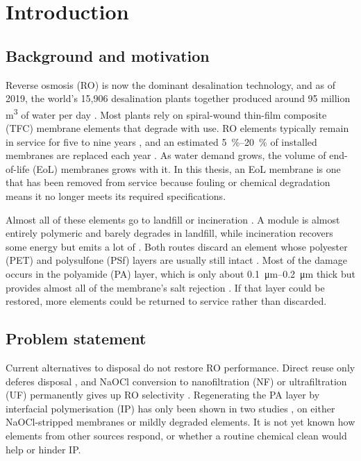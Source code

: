 \chapter{Introduction}
\label{ch:introduction}


\section{Background and motivation}
\label{sec:background}
Reverse osmosis (RO) is now the dominant desalination technology, and as of 2019, the world's 15,906 desalination plants together produced around 95 million \unit{\cubic\metre} of water per day \citep{Jones2019}. Most plants rely on spiral-wound thin-film composite (TFC) membrane elements that degrade with use. RO elements typically remain in service for five to nine years \citep{Ding_2026,Lawler2015}, and an estimated \qtyrange{5}{20}{\percent} of installed membranes are replaced each year \citep{BerattoRamos2024,Guclu2022}. As water demand grows, the volume of end-of-life (EoL) membranes grows with it. In this thesis, an EoL membrane is one that has been removed from service because fouling or chemical degradation means it no longer meets its required specifications.

Almost all of these elements go to landfill or incineration \citep{Khanzada2024}. A module is almost entirely polymeric and barely degrades in landfill, while incineration recovers some energy but emits a lot of  \citep{Lawler2015}. Both routes discard an element whose polyester (PET) and polysulfone (PSf) layers are usually still intact \citep{Molinaa2018}. Most of the damage occurs in the polyamide (PA) layer, which is only about \qtyrange{0.1}{0.2}{\micro\metre} thick but provides almost all of the membrane's salt rejection \citep{LejarazuLarranaga2022}. If that layer could be restored, more elements could be returned to service rather than discarded.


\section{Problem statement}
\label{sec:problem}
Current alternatives to disposal do not restore RO performance. Direct reuse only deferes disposal \citep{Lawler2015}, and NaOCl conversion to nanofiltration (NF) or ultrafiltration (UF) permanently gives up RO selectivity \citep{GarciaPacheco2015,Molinaa2018}. Regenerating the PA layer by interfacial polymerisation (IP) has only been shown in two studies \citep{Ogbe2025,Ogbe2026}, on either NaOCl-stripped membranes or mildly degraded elements. It is not yet known how elements from other sources respond, or whether a routine chemical clean would help or hinder IP. 


